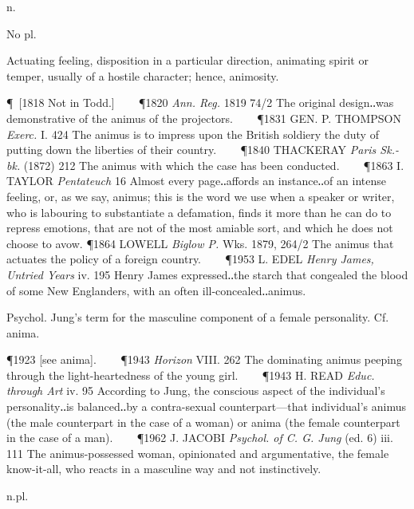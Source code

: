 \begin{description}[wide, labelwidth=!, labelindent=0pt]
  n.

\noindent  {}


\noindent  
No pl. 

\begin{myenumerate}
 Actuating feeling, disposition in a particular direction, animating spirit
or temper, usually of a hostile character; hence, animosity. 

\P [1818 Not in Todd.]    
\P 1820 \textit{Ann. Reg.} 1819 74/2 The original design‥was demonstrative of the animus of the projectors.    
\P 1831 GEN. P. THOMPSON \textit{Exerc.}
I. 424 The animus is to impress upon the British soldiery the duty of putting
down the liberties of their country.    
\P 1840 THACKERAY \textit{Paris Sk.-bk.} (1872) 212
The animus with which the case has been conducted.    
\P 1863 I. TAYLOR \textit{Pentateuch} 16 Almost every page‥affords an instance‥of an 
intense feeling, or, as we say,
animus; this is the word we use when a speaker or writer, who is labouring to
substantiate a defamation, finds it more than he can do to repress emotions,
that are not of the most amiable sort, and which he does not choose to avow.
\P 1864 LOWELL \textit{Biglow P.} Wks. 1879, 264/2 The animus that actuates the policy of
a foreign country.    
\P 1953 L. EDEL \textit{Henry James, Untried Years} iv. 195 Henry
James expressed‥the starch that congealed the blood of some New Englanders, with
an often ill-concealed‥animus.

 Psychol. Jung's term for the masculine component of a female personality.
Cf. anima. 

\P 1923 [see anima].    
\P 1943 \textit{Horizon} VIII. 262 The dominating animus peeping
through the light-heartedness of the young girl.    
\P 1943 H. READ \textit{Educ. through Art} iv. 95 According to Jung, the conscious aspect of the individual's
personality‥is balanced‥by a contra-sexual counterpart—that individual's animus
(the male counterpart in the case of a woman) or anima (the female counterpart
in the case of a man).    
\P 1962 J. JACOBI \textit{Psychol. of C. G. Jung} (ed. 6) iii. 111
The animus-possessed woman, opinionated and argumentative, the female
know-it-all, who reacts in a masculine way and not instinctively.
\end{myenumerate}

  n.pl.


\end{description}
